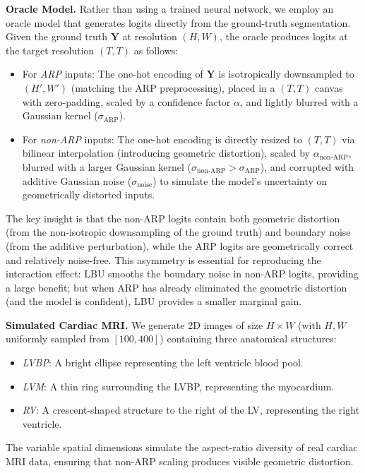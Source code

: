 \documentclass[10pt,twocolumn]{article}
\begin{document}
\textbf{Oracle Model.}
Rather than using a trained neural network, we employ an oracle model that generates logits directly from the ground-truth segmentation.
Given the ground truth $\mathbf{Y}$ at resolution $(H, W)$, the oracle produces logits at the target resolution $(T, T)$ as follows:
\begin{itemize}[leftmargin=*]
    \item For \textit{ARP} inputs: The one-hot encoding of $\mathbf{Y}$ is isotropically downsampled to $(H', W')$ (matching the ARP preprocessing), placed in a $(T, T)$ canvas with zero-padding, scaled by a confidence factor $\alpha$, and lightly blurred with a Gaussian kernel ($\sigma_{\text{ARP}}$).
    \item For \textit{non-ARP} inputs: The one-hot encoding is directly resized to $(T, T)$ via bilinear interpolation (introducing geometric distortion), scaled by $\alpha_{\text{non-ARP}}$, blurred with a larger Gaussian kernel ($\sigma_{\text{non-ARP}} > \sigma_{\text{ARP}}$), and corrupted with additive Gaussian noise ($\sigma_{\text{noise}}$) to simulate the model's uncertainty on geometrically distorted inputs.
\end{itemize}
The key insight is that the non-ARP logits contain both geometric distortion (from the non-isotropic downsampling of the ground truth) and boundary noise (from the additive perturbation), while the ARP logits are geometrically correct and relatively noise-free.
This asymmetry is essential for reproducing the interaction effect: LBU smooths the boundary noise in non-ARP logits, providing a large benefit; but when ARP has already eliminated the geometric distortion (and the model is confident), LBU provides a smaller marginal gain.

\textbf{Simulated Cardiac MRI.}
We generate 2D images of size $H \times W$ (with $H, W$ uniformly sampled from $[100, 400]$) containing three anatomical structures:
\begin{itemize}[leftmargin=*]
    \item \textit{LVBP}: A bright ellipse representing the left ventricle blood pool.
    \item \textit{LVM}: A thin ring surrounding the LVBP, representing the myocardium.
    \item \textit{RV}: A crescent-shaped structure to the right of the LV, representing the right ventricle.
\end{itemize}
The variable spatial dimensions simulate the aspect-ratio diversity of real cardiac MRI data, ensuring that non-ARP scaling produces visible geometric distortion.
\end{document}
